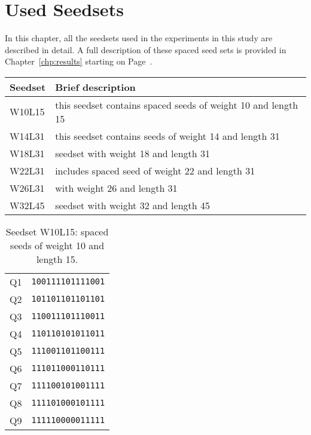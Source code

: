 \chapter{Used Seedsets}
\label{chp:used-seedsets}


In this chapter, all the seedsets used in the experiments in this study are described in detail. A full description of these spaced seed sets is provided in Chapter~\ref{chp:results} starting on Page~\pageref{subsec:seedset}.

\begin{table}[!ht]
	\centering
	\begin{tabular}{l l}
		\textbf{Seedset} & \textbf{Brief description} \\
		\toprule
		W10L15 & this seedset contains spaced seeds of weight 10 and length 15 \\
		W14L31 & this seedset contains seeds of weight 14 and length 31 \\
		W18L31 & seedset with weight 18 and length 31 \\
		W22L31 & includes spaced seed of weight 22 and length 31 \\
		W26L31 & with weight 26 and length 31 \\
		W32L45 & seedset with weight 32 and length 45 \\
		\bottomrule
	\end{tabular}
\end{table}
\clearpage


\begin{table}[!ht]
	\centering
	\begin{tabular}{l r}
		Q1 & \verb|100111101111001| \\
		Q2 & \verb|101101101101101| \\
		Q3 & \verb|110011101110011| \\
		Q4 & \verb|110110101011011| \\
		Q5 & \verb|111001101100111| \\
		Q6 & \verb|111011000110111| \\
		Q7 & \verb|111100101001111| \\
		Q8 & \verb|111101000101111| \\
		Q9 & \verb|111110000011111| \\
		\bottomrule
	\end{tabular}
	\caption{Seedset W10L15: spaced seeds of weight 10 and length 15.}
	\label{tab:seedset-W10L15}
\end{table}


